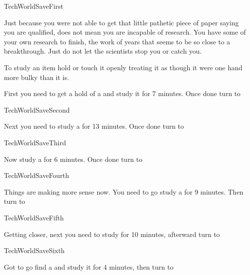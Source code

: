 \documentclass[greennotebook]{guildcamp3} %
\begin{document}
\startnotebook{\nTechWorldSave{}}

\begin{page}{TechWorldSaveFirst}
	
Just because you were not able to get that little pathetic piece of paper saying you are qualified, does not mean you are incapable of research. You have some of your own research to finish, the work of years that seems to be so close to a breakthrough. Just do not let the scientists stop you or catch you.  

To study an item hold or touch it openly treating it as though it were one hand more bulky than it is. 

First you need to get a hold of a \iDiamondDrill{} and study it for 7 minutes. Once done turn to 
	
\end{page}

\begin{page}{TechWorldSaveSecond}
	
Next you need to study a \iMagnet{} for 13 minutes. Once done turn to 

	
\end{page}

\begin{page}{TechWorldSaveThird}
	
Now study a \iCentrifuge{} for 6 minutes. Once done turn to 
	
\end{page}

\begin{page}{TechWorldSaveFourth}
	
	Things are making more sense now. You need to go study a \iLeadPipe{} for 9 minutes. Then turn to 
	
\end{page}

\begin{page}{TechWorldSaveFifth}
	
	Getting closer, next you need to study \iScrapMetal{} for 10 minutes, afterward turn to  
	
\end{page}

\begin{page}{TechWorldSaveSixth}
	
	 Got to go find a \iSieve{} and study it for 4 minutes, then turn to  
	
\end{page}
\end{document}
